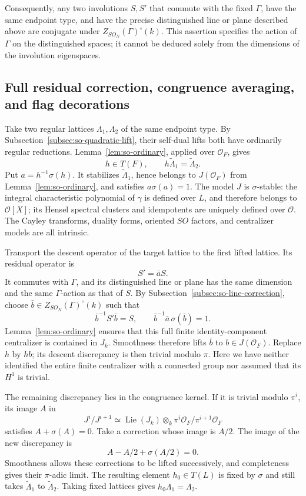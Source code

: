 \documentclass[11pt,a4paper]{article}
\theoremstyle{definition}
\theoremstyle{remark}
\begin{document}
Consequently, any two involutions \(S,S'\) that commute with
the fixed \(\Gamma\), have the same endpoint type, and have
the precise distinguished line or plane described above are
conjugate under \(Z_{SO_N}(\Gamma)^\circ(k)\).
This assertion specifies the action of \(\Gamma\) on the
distinguished spaces; it cannot be deduced solely from the
dimensions of the involution eigenspaces.

\subsection{Full residual correction, congruence averaging, and flag decorations}
\label{subsec:so-descent}

Take two regular lattices \(\Lambda_1,\Lambda_2\) of the same
endpoint type. By Subsection~\ref{subsec:so-quadratic-lift},
their self-dual lifts both have ordinarily regular reductions.
Lemma~\ref{lem:so-ordinary}, applied over \(\mathcal O_F\),
gives
\[
 h\in T(F),\qquad
 h\widetilde\Lambda_1=\widetilde\Lambda_2.
\]
Put \(a=h^{-1}\sigma(h)\). It stabilizes
\(\widetilde\Lambda_1\), hence belongs to
\(J(\mathcal O_F)\) from Lemma~\ref{lem:so-ordinary}, and
satisfies \(a\sigma(a)=1\). The model \(J\) is
\(\sigma\)-stable: the integral characteristic polynomial of
\(\gamma\) is defined over \(L\), and therefore belongs to
\(\mathcal O[X]\); its Hensel spectral clusters and idempotents
are uniquely defined over \(\mathcal O\). The Cayley
transforms, duality forms, oriented \(SO\) factors, and
centralizer models are all intrinsic.

Transport the descent operator of the target lattice to the
first lifted lattice. Its residual operator is
\[
 S'=\bar a S.
\]
It commutes with \(\Gamma\), and its distinguished line or
plane has the same dimension and the same \(\Gamma\)-action
as that of \(S\). By
Subsection~\ref{subsec:so-line-correction}, choose
\(\bar b\in Z_{SO_N}(\Gamma)^\circ(k)\) such that
\[
 \bar b^{-1}S'\bar b=S,\qquad
 \bar b^{-1}\bar a\,\sigma(\bar b)=1.
\]
Lemma~\ref{lem:so-ordinary} ensures that this full finite
identity-component centralizer is contained in \(J_k\).
Smoothness therefore lifts \(\bar b\) to
\(b\in J(\mathcal O_F)\). Replace \(h\) by \(hb\); its
descent discrepancy is then trivial modulo \(\pi\).
Here we have neither identified the entire finite
centralizer with a connected group nor assumed that its
\(H^1\) is trivial.

The remaining discrepancy lies in the congruence kernel.
If it is trivial modulo \(\pi^i\), its image \(A\) in
\[
 J^i/J^{i+1}
 \simeq\operatorname{Lie}(J_k)\otimes_k
             \pi^i\mathcal O_F/\pi^{i+1}\mathcal O_F
\]
satisfies \(A+\sigma(A)=0\). Take a correction whose image
is \(A/2\). The image of the new discrepancy is
\[
 A-A/2+\sigma(A/2)=0.
\]
Smoothness allows these corrections to be lifted
successively, and completeness gives their \(\pi\)-adic
limit. The resulting element \(h_0\in T(L)\) is fixed by
\(\sigma\) and still takes \(\widetilde\Lambda_1\) to
\(\widetilde\Lambda_2\). Taking fixed lattices gives
\(h_0\Lambda_1=\Lambda_2\).
\end{document}
